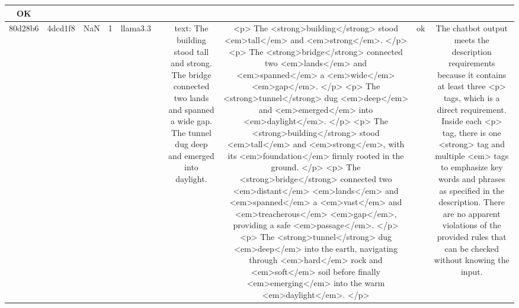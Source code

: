 \begin{table}[h!]
\begin{tabular}{|c|c|c|c|c|c|c|c|c|c|}
OK\\
\hline
80d28b6 & 4dcd1f8 & NaN & 1 & llama3.3 &  & text: The building stood tall and strong. The bridge connected two lands and spanned a wide gap. The tunnel dug deep and emerged into daylight. & <p> The <strong>building</strong> stood <em>tall</em> and <em>strong</em>. </p>
<p> The <strong>bridge</strong> connected two <em>lands</em> and <em>spanned</em> a <em>wide</em> <em>gap</em>. </p>
<p> The <strong>tunnel</strong> dug <em>deep</em> and <em>emerged</em> into <em>daylight</em>. </p>
<p> The <strong>building</strong> stood <em>tall</em> and <em>strong</em>, with its <em>foundation</em> firmly rooted in the ground. </p>
<p> The <strong>bridge</strong> connected two <em>distant</em> <em>lands</em> and <em>spanned</em> a <em>vast</em> and <em>treacherous</em> <em>gap</em>, providing a safe <em>passage</em>. </p>
<p> The <strong>tunnel</strong> dug <em>deep</em> into the earth, navigating through <em>hard</em> rock and <em>soft</em> soil before finally <em>emerging</em> into the warm <em>daylight</em>. </p> & ok & The chatbot output meets the description requirements because it contains at least three <p> tags, which is a direct requirement. Inside each <p> tag, there is one <strong> tag and multiple <em> tags to emphasize key words and phrases as specified in the description. There are no apparent violations of the provided rules that can be checked without knowing the input. 


\end{tabular}
\end{table}
